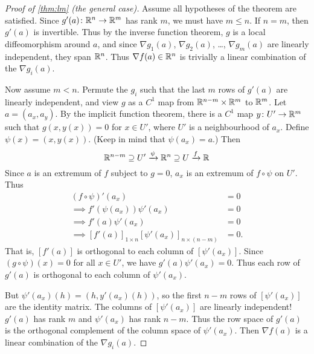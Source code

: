\begin{proof}[Proof of \cref{thm:lm} (the general case)]
    Assume all hypotheses of the theorem are satisfied.
    Since $g'(a)\colon \mathbb{R}^n \to \mathbb{R}^m$ has rank $m$, we must have $m \le n$.
    If $n = m$, then $g'(a)$ is invertible.
    Thus by the inverse function theorem, $g$ is a local diffeomorphism
    around $a$, and since $\nabla g_1(a)$, $\nabla g_2(a)$, \dots,
    $\nabla g_m(a)$ are linearly independent, they span $\mathbb{R}^n$.
    Thus $\nabla f(a) \in \mathbb{R}^n$ is trivially a linear combination of
    the $\nabla g_i(a)$.

    Now assume $m < n$.
    Permute the $g_i$ such that the last $m$ rows of $g'(a)$ are linearly
    independent, and view $g$ as a $C^1$ map from $\mathbb{R}^{n-m} \times \mathbb{R}^m$
    to $\mathbb{R}^m$.
    Let $a = (a_x, a_y)$.
    By the implicit function theorem, there is a $C^1$ map
    $y\colon U' \to \mathbb{R}^m$ such that $g(x, y(x)) = 0$ for $x \in U'$,
    where $U'$ is a neighbourhood of $a_x$.
    Define $\psi(x) = (x, y(x))$.
    {\small(Keep in mind that $\psi(a_x) = a$.)}
    Then \[
        \mathbb{R}^{n-m} \supseteq U'
            \xrightarrow{\psi} \mathbb{R}^n \supseteq U
            \xrightarrow{f} \mathbb{R}
    \] Since $a$ is an extremum of $f$ subject to $g = 0$,
    $a_x$ is an extremum of $f \circ \psi$ on $U'$.
    Thus \begin{align*}
        (f \circ \psi)'(a_x) &= 0 \\
        \implies f'(\psi(a_x))\psi'(a_x) &= 0 \\
        \implies f'(a) \psi'(a_x) &= 0 \\
        \implies [f'(a)]_{1 \times n} [\psi'(a_x)]_{n \times (n-m)} &= 0.
    \end{align*}
    That is, $[f'(a)]$ is orthogonal to each column of $[\psi'(a_x)]$.
    Since $(g \circ \psi)(x) = 0$ for all $x \in U'$, we have
    $g'(a)\psi'(a_x) = 0$.
    Thus each row of $g'(a)$ is orthogonal to each column of $\psi'(a_x)$.

    But $\psi'(a_x)(h) = (h, y'(a_x)(h))$, so the first $n-m$ rows of
    $[\psi'(a_x)]$ are the identity matrix.
    The columns of $[\psi'(a_x)]$ are linearly independent!
    $g'(a)$ has rank $m$ and $\psi'(a_x)$ has rank $n-m$.
    Thus the row space of $g'(a)$ is the orthogonal complement of the
    column space of $\psi'(a_x)$.
    Then $\nabla f(a)$ is a linear combination of the $\nabla g_i(a)$.
\end{proof}
